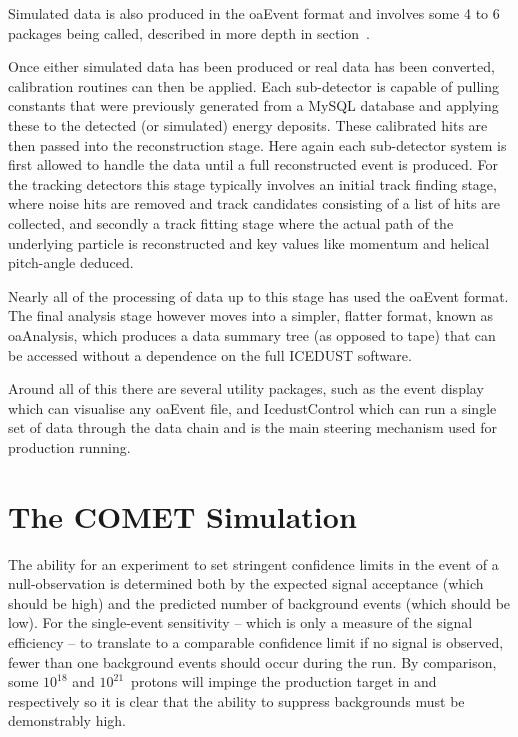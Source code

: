 Simulated data is also produced in the oaEvent format and involves some 4 to 6 packages being called, described in more depth in section~.

Once either simulated data has been produced or real data has been converted, calibration routines can then be applied.
Each sub-detector is capable of pulling constants that were previously generated from a MySQL database and applying these to the detected (or simulated) energy deposits.
These calibrated hits are then passed into the reconstruction stage.  
Here again each sub-detector system is first allowed to handle the data until a full reconstructed event is produced.
For the tracking detectors this stage typically involves an initial track finding stage, where noise hits are removed and track candidates consisting of a list of hits are collected, and secondly a track fitting stage where the actual path of the underlying particle is reconstructed and key values like momentum and helical pitch-angle deduced.

Nearly all of the processing of data up to this stage has used the oaEvent format.
The final analysis stage however moves into a simpler, flatter format, known as oaAnalysis, which produces a data summary tree (as opposed to tape) that can be accessed without a dependence on the full ICEDUST software.

Around all of this there are several utility packages, such as the event display which can visualise any oaEvent file, and IcedustControl which can run a single set of data through the data chain and is the main steering mechanism used for production running.

\section{The COMET Simulation}
The ability for an experiment to set stringent confidence limits in the event of a null-observation is determined both by the expected signal acceptance (which should be high) and the predicted number of background events (which should be low).
For the single-event sensitivity -- which is only a measure of the signal efficiency -- to translate to a comparable confidence limit if no signal is observed, fewer than one background events should occur during the run.
By comparison, some $10^{18}$ and $10^{21}$~protons  will impinge the production target in \phaseI and \phaseII respectively so it is clear that the ability to suppress backgrounds must be demonstrably high.

